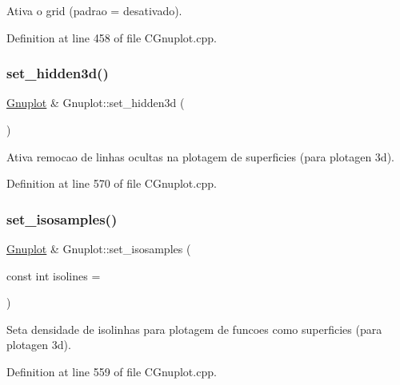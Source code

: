Ativa o grid (padrao = desativado). 



Definition at line 458 of file C\+Gnuplot.\+cpp.

\mbox{\label{class_gnuplot_a5ada5c76db0a735d3d331caa0eb4968a}} 
\subsubsection{\texorpdfstring{set\+\_\+hidden3d()}{set\_hidden3d()}}
{\footnotesize\ttfamily \hyperlink{class_gnuplot}{Gnuplot} \& Gnuplot\+::set\+\_\+hidden3d (\begin{DoxyParamCaption}{ }\end{DoxyParamCaption})}



Ativa remocao de linhas ocultas na plotagem de superficies (para plotagen 3d). 



Definition at line 570 of file C\+Gnuplot.\+cpp.

\mbox{\label{class_gnuplot_ab810fa4c02fb49ae197786c305b78702}} 
\subsubsection{\texorpdfstring{set\+\_\+isosamples()}{set\_isosamples()}}
{\footnotesize\ttfamily \hyperlink{class_gnuplot}{Gnuplot} \& Gnuplot\+::set\+\_\+isosamples (\begin{DoxyParamCaption}\item[{const int}]{isolines = {} }\end{DoxyParamCaption})}



Seta densidade de isolinhas para plotagem de funcoes como superficies (para plotagen 3d). 



Definition at line 559 of file C\+Gnuplot.\+cpp.

\mbox{\label{class_gnuplot_ad64a717dac18167f656c4f09239973f8}} 

